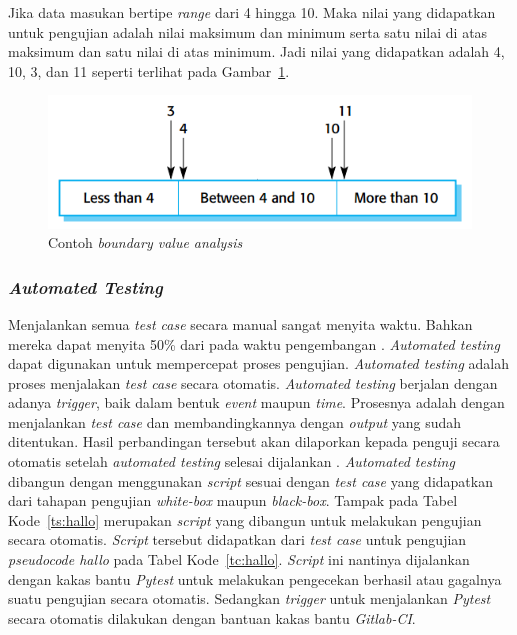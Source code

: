 Jika data masukan bertipe \emph{range} dari 4 hingga 10. Maka nilai
yang didapatkan untuk pengujian adalah nilai maksimum dan minimum
serta satu nilai di atas maksimum dan satu nilai di atas minimum. Jadi
nilai yang didapatkan adalah 4, 10, 3, dan 11 seperti terlihat pada
Gambar~\ref{fig:contoh-bva-marked}.

\begin{figure}[H]
  \centering
  \includegraphics[width=.6\linewidth]{img/contoh-bva-marked}
  \caption{Contoh \emph{boundary value analysis}
    \parencite{sommerville2016software}}\label{fig:contoh-bva-marked}
\end{figure}

\subsubsection{\emph{Automated Testing}}

Menjalankan semua \emph{test case} secara manual sangat menyita
waktu. Bahkan mereka dapat menyita 50\% dari pada waktu pengembangan
\parencite{brooks1995mythical}. \emph{Automated testing} dapat
digunakan untuk mempercepat proses pengujian. \emph{Automated testing}
adalah proses menjalakan \emph{test case} secara otomatis.
\emph{Automated testing} berjalan dengan adanya \emph{trigger}, baik
dalam bentuk \emph{event} maupun \emph{time}. Prosesnya adalah dengan
menjalankan \emph{test case} dan membandingkannya dengan \emph{output}
yang sudah ditentukan. Hasil perbandingan tersebut akan dilaporkan
kepada penguji secara otomatis setelah \emph{automated testing}
selesai dijalankan \parencite{marcellintravis}. \emph{Automated
  testing} dibangun dengan menggunakan \emph{script} sesuai dengan
\emph{test case} yang didapatkan dari tahapan pengujian
\emph{white-box} maupun \emph{black-box}. Tampak pada Tabel
Kode~\ref{ts:hallo} merupakan \emph{script} yang dibangun untuk
melakukan pengujian secara otomatis. \emph{Script} tersebut didapatkan dari
\emph{test case} untuk pengujian \emph{pseudocode hallo} pada Tabel
Kode~\ref{tc:hallo}. \emph{Script} ini nantinya dijalankan dengan
kakas bantu \emph{Pytest} untuk melakukan pengecekan berhasil atau
gagalnya suatu pengujian secara otomatis. Sedangkan \emph{trigger} untuk
menjalankan \emph{Pytest} secara otomatis dilakukan dengan bantuan
kakas bantu \emph{Gitlab-CI}.

